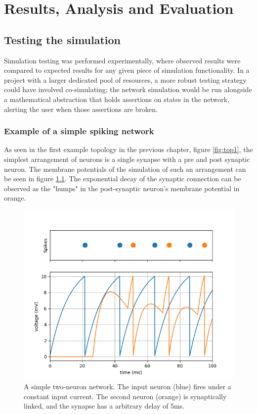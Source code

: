\chapter{Results, Analysis and Evaluation}

\section{Testing the simulation}

Simulation testing was performed experimentally, where observed results were
compared to expected results for any given piece of simulation functionality. In
a project with a larger dedicated pool of resources, 
a more robust testing strategy could have involved co-simulating; the
network simulation would be run alongside a mathematical abstraction that holds
assertions on states in the network, alerting the user when those assertions
are broken.

\subsection{Example of a simple spiking network}

As seen in the first example topology in the previous chapter, figure
\ref{fig:top1}, the simplest arrangement of neurons is a single synapse with a
pre and post synaptic neuron. The membrane potentials of the simulation of such
an arrangement can be seen in figure \ref{fig:PRERES1}. The exponential decay of
the synaptic connection can be observed as the "humps" in the post-synaptic
neuron's membrane potential in orange.

\begin{figure}[h!]
    \centering
    \includegraphics[width=0.7\linewidth]{figures/graphs/DelayBugFixed.png}
    \caption[A simple two-neuron network]{A simple two-neuron network. The input neuron (blue) fires under a constant input current. The second neuron (orange) is synaptically linked, and the synapse has a arbitrary delay of 5ms.}
    \label{fig:PRERES1}
\end{figure}
\FloatBarrier

